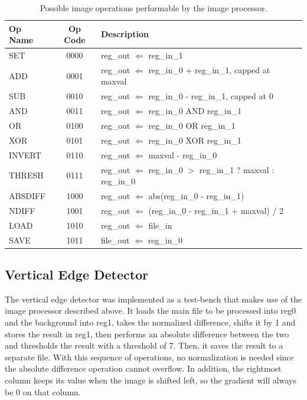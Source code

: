 \documentclass[a4paper, 10pt, titlepage]{article}
\begin{document}
\begin{table}
    \centering
    \begin{tabular}[c]{ l | c | p{10cm} }
        \textbf{Op Name} & \textbf{Op Code} & \textbf{Description} \\
        \hline
        SET & 0000 & reg\_out $\Leftarrow$ reg\_in\_1 \\
        ADD & 0001 & reg\_out $\Leftarrow$ reg\_in\_0 + reg\_in\_1, capped at maxval \\
        SUB & 0010 & reg\_out $\Leftarrow$ reg\_in\_0 - reg\_in\_1, capped at 0 \\
        AND & 0011 & reg\_out $\Leftarrow$ reg\_in\_0 AND reg\_in\_1 \\
        OR & 0100 & reg\_out $\Leftarrow$ reg\_in\_0 OR reg\_in\_1 \\
        XOR & 0101 & reg\_out $\Leftarrow$ reg\_in\_0 XOR reg\_in\_1 \\
        INVERT & 0110 & reg\_out $\Leftarrow$ maxval - reg\_in\_0 \\
        THRESH & 0111 & reg\_out $\Leftarrow$ reg\_in\_0 $>$ reg\_in\_1 ? maxval : reg\_in\_0 \\
        ABSDIFF & 1000 & reg\_out $\Leftarrow$ abs(reg\_in\_0 - reg\_in\_1) \\
        NDIFF & 1001 & reg\_out $\Leftarrow$ (reg\_in\_0 - reg\_in\_1 + maxval) / 2 \\
        LOAD & 1010 & reg\_out $\Leftarrow$ file\_in \\
        SAVE & 1011 & file\_out $\Leftarrow$ reg\_in\_0 \\
    \end{tabular}
    \caption{Possible image operations performable by the image processor.}
    \label{tab:image_operations}
\end{table}

\subsection{Vertical Edge Detector}

The vertical edge detector was implemented as a test-bench that makes use of the image processor described above. It loads the main file to be processed into reg0 and the background into reg1, takes the normalized difference, shifts it by 1 and stores the result in reg1, then performs an absolute difference between the two and thresholds the result with a threshold of 7. Then, it saves the result to a separate file. With this sequence of operations, no normalization is needed since the absolute difference operation cannot overflow. In addition, the rightmost column keeps its value when the image is shifted left, so the gradient will always be 0 on that column.
\end{document}
